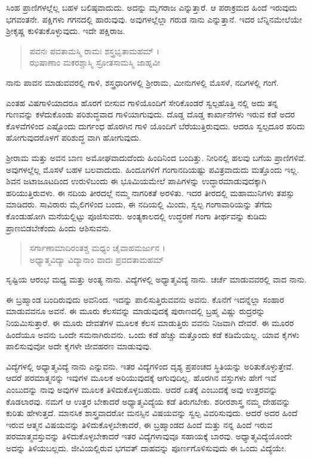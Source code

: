 ಸಿಂಹ ಪ್ರಾಣಿಗಳಲ್ಲೆಲ್ಲ ಬಹಳ ಬಲಿಷ್ಠವಾದುದು. ಅದನ್ನು ಮೃಗರಾಜ ಎನ್ನುತ್ತಾರೆ. ಆ ಪರಾಕ್ರಮದ ಹಿಂದೆ ಇರುವುದು ಭಗವಂತನೇ. ಪಕ್ಷಿಗಳು ಗಗನದಲ್ಲಿ ಹಾರುವುವು. ಅವುಗಳಲ್ಲೆಲ್ಲಾ ಗರುಡ ನಾನು ಎನ್ನುತ್ತಾನೆ. ಇದರ ಬೆನ್ನಿನಮೇಲೆಯೇ ಶ್ರೀಕೃಷ್ಣ ಕುಳಿತುಕೊಳ್ಳುವುದು. ಇದೇ ಪಕ್ಷಿರಾಜ.

\begin{verse}
ಪವನಃ ಪವತಾಮಸ್ಮಿ ರಾಮಃ ಶಸ್ತ್ರಭೃತಾಮಹಮ್ ।\\ಝಷಾಣಾಂ ಮಕರಶ್ಚಾಸ್ಮಿ ಸ್ರೋತಸಾಮಸ್ಮಿ ಜಾಹ್ನವೀ 
\end{verse}

{\small ನಾನು ಪಾವನ ಮಾಡುವವರಲ್ಲಿ ಗಾಳಿ, ಶಸ್ತ್ರಧಾರಿಗಳಲ್ಲಿ ಶ್ರೀರಾಮ, ಮೀನುಗಳಲ್ಲಿ ಮೊಸಳೆ, ನದಿಗಳಲ್ಲಿ ಗಂಗೆ.}

ಎಂತಹ ವಿಷಗಾಳಿಯಾದರೂ ಹೊರಗೆ ಬೀಸುವ ಗಾಳಿಯೊಂದಿಗೆ ಸೇರಿಕೊಂಡರೆ ಸ್ವಲ್ಪಹೊತ್ತಿ ನಲ್ಲಿ ಅದು ತನ್ನ ಗುಣವನ್ನು ಕಳೆದುಕೊಂಡು ಪರಿಶುದ್ಧವಾದ ಗಾಳಿಯಾಗುವುದು. ದೊಡ್ಡ ದೊಡ್ಡ ಕಾರ್ಖಾನೆಗಳು ಇರುವ ಕಡೆ ಅದರ ಕೊಳವೆಗಳಿಂದ ಎಷ್ಟೊಂದು ದುರ್ಗಂಧ ಹೊರಗಿನ ಗಾಳಿ ಯೊಂದಿಗೆ ಬೆರೆಯುತ್ತಿರುವುದು. ಆದರೂ ಸ್ವಲ್ಪದೂರ ಹರಿದು ಹೋಗುವುದರೊಳಗೆ ಪರಿಶುದ್ಧ ವಾಗಿ ಹೋಗುವುದು.

ಶ್ರೀರಾಮ ಮತ್ತು ಅವನ ಬಾಣ ಅಮೋಘವಾದುದೆಂದು ಹಿಂದಿನಿಂದ ಬಂದಿತ್ತು. ನೀರಿನಲ್ಲಿ ಹಲವು ಬಗೆಯ ಪ್ರಾಣಿಗಳಿವೆ. ಅವುಗಳಲ್ಲೆಲ್ಲ ಮೊಸಳೆ ಬಹಳ ಬಲವಾದುದು. ಹಿಂದೂಗಳಿಗೆ ಗಂಗಾನದಿಯಷ್ಟು ಪವಿತ್ರವಾದುದು ಮತ್ತೊಂದು ಇಲ್ಲ. ಶಿವನ ಜಟಾಜೂಟದಿಂದ ಉರುಳಿಬಂದು ಈ ಭೂಮಿಯಮೇಲೆ ಪಾಪಿಗಳನ್ನು ಉದ್ಧಾರಮಾಡುವುದಕ್ಕಾಗಿ ಹರಿಯುತ್ತಿರುವಳು. ಈ ನದಿಯ ತೀರದಲ್ಲೆ ನಮ್ಮ ನಾಗರಿಕತೆ ಅರಳಿತು. ಇದರ ತೀರದಲ್ಲಿ ಮಹಾಮುನಿಗಳು ತಪಸ್ಸು ಮಾಡಿದರು. ಸಾವಿರಾರು ಮೈಲಿಗಳಿಂದ ಬಂದು, ಈ ನದಿಯಲ್ಲಿ ಮಿಂದು, ಸ್ವಲ್ಪ ಗಂಗಾವಾರಿಯನ್ನು ತೆಗೆದು ಕೊಂಡುಹೋಗಿ ಮನೆಯಲ್ಲಿಟ್ಟು ಪೂಜಿಸುವರು. ಅಂತ್ಯಕಾಲದಲ್ಲಿ ಉದ್ಧರಣೆ ಗಂಗಾ ತೀರ್ಥವನ್ನು ಕುಡಿದು ಪ್ರಾಣಬಿಡಬೇಕೆಂದು ಹಿಂದು ಆಶಿಸುವನು.

\begin{verse}
ಸರ್ಗಾಣಾಮಾದಿರಂತಶ್ಚ ಮಧ್ಯಂ ಚೈವಾಹಮರ್ಜುನ ।\\ಅಧ್ಯಾತ್ಮವಿದ್ಯಾ ವಿದ್ಯಾನಾಂ ವಾದಃ ಪ್ರವದತಾಮಹಮ್ 
\end{verse}

{\small ಸೃಷ್ಟಿಯ ಆರಂಭ ಮಧ್ಯ ಮತ್ತು ಅಂತ್ಯ ನಾನು. ವಿದ್ಯೆಗಳಲ್ಲಿ ಅಧ್ಯಾತ್ಮವಿದ್ಯೆ ನಾನು. ಚರ್ಚೆ ಮಾಡುವವರಲ್ಲಿ ವಾದ ನಾನು.}

ಈ ಬ್ರಹ್ಮಾಂಡ ಬಂದಿರುವುದು ಅವನಿಂದ. ಇದನ್ನು ಪಾಲಿಸುತ್ತಿರುವವನು ಅವನು. ಕೊನೆಗೆ ಇದನ್ನೆಲ್ಲಾ ಸಂಹಾರ ಮಾಡುವವನೂ ಅವನೆ. ಈ ಮೂರು ಕೆಲಸವನ್ನು ಮಾಡುವುದಕ್ಕೆ ಪುರಾಣದಲ್ಲಿ ಬ್ರಹ್ಮ ವಿಷ್ಣು ರುದ್ರರನ್ನು ನಿಯಮಿಸುತ್ತಾರೆ. ಈ ಮೂರು ದೇವತೆಗಳ ಮೂಲಕ ಕೆಲಸ ಮಾಡುತ್ತಿರು ವವನು ನಿಜವಾಗಿ ದೇವರೆ. ಈ ಮೂರರ ಹಿಂದೆಯೂ ಅವನು ಒಂದೇ ಸಮನಾಗಿರುವನು. ಒಂದು ಕಡೆ ಹೆಚ್ಚು ಮತ್ತೊಂದು ಕಡೆ ಕಡಿಮೆಯಲ್ಲ. ಯಾವ ಕೈಗಳು ಪಾಲಿಸುವುವೋ ಅದೇ ಕೈಗಳೇ ಜೀವಹರಣ ಮಾಡುವುವು.

ವಿದ್ಯೆಗಳಲ್ಲಿ ಅಧ್ಯಾತ್ಮವಿದ್ಯೆ ನಾನು ಎನ್ನುವನು. ಇತರ ವಿದ್ಯೆಗಳಿಂದ ದೃಶ್ಯ ಪ್ರಪಂಚದ ಸ್ಥಿತಿಯನ್ನು ಅರಿತುಕೊಳ್ಳುತ್ತೇವೆ. ಆದರೆ ಪರಮಾತ್ಮನನ್ನು ಇವುಗಳ ಮೂಲಕ ಅರಿಯುವುದಕ್ಕೆ ಆಗುವುದಿಲ್ಲ. ಹೊರಗಿನ ವಸ್ತುಗಳು ಹೇಗೆ ಇವೆ ಎಂಬುದನ್ನು ನಾವು ಅವುಗಳ ಮೂಲಕ ತಿಳಿದುಕೊಳ್ಳಬಹುದು. ಆದರೆ ಏತಕ್ಕೆ ಎಂಬುದಕ್ಕೆ ಅವು ಉತ್ತರವನ್ನು ಕೊಡಲಾರವು. ನಮಗೆ ಆ ಉತ್ತರ ಬೇಕಾದರೆ ಅಧ್ಯಾತ್ಮವಿದ್ಯೆಯ ಕಡೆ ತಿರುಗಬೇಕು. ಶರೀರಶಾಸ್ತ್ರ ನಮ್ಮ ದೇಹವನ್ನು ಕುರಿತು ಹೇಳುತ್ತದೆ. ಮಾನಸಿಕ ಶಾಸ್ತ್ರವಾದರೋ ಮನಸ್ಸಿನ ವಿಷಯವನ್ನು ಸ್ವಲ್ಪ ವಿವರಿಸುವುದು. ಆದರೆ ಅದರ ಹಿಂದೆ ಇರುವ ಆತ್ಮನ ವಿಷಯವನ್ನು ತಿಳಿದುಕೊಳ್ಳಬೇಕಾದರೆ, ಈ ಬ್ರಹ್ಮಾಂಡದ ಹಿಂದೆ ಮತ್ತು ನನ್ನ ಹಿಂದೆ ಇರುವ ಪರಮಾತ್ಮವಸ್ತುವನ್ನು ತಿಳಿದುಕೊಳ್ಳಬೇಕಾದರೆ ಇತರ ವಿದ್ಯೆಗಳಾವುವೂ ಸಹಾಯಕ್ಕೆ ಬಾರವು. ಅಧ್ಯಾತ್ಮವಿದ್ಯೆಯೊಂದೇ ಅದನ್ನು ತಿಳಿಯಬಲ್ಲದು. ಜೀವಿಯಲ್ಲಿರುವ ಭಗವತ್ ದಾಹವನ್ನು ಪೂರ್ಣಗೊಳಿಸುವುದು ಈ ಒಂದು ವಿದ್ಯೆಯೇ.

